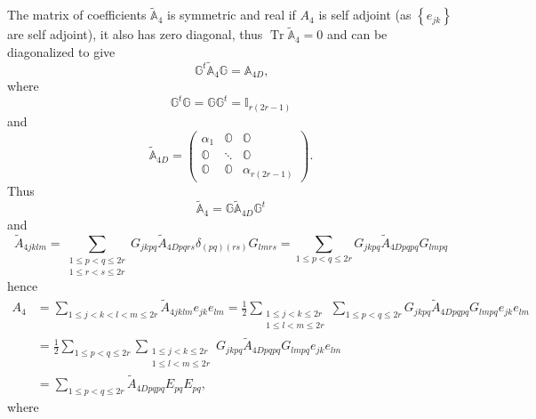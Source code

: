\documentclass[aps, preprint]{revtex4}
\begin{document}
The matrix of coefficients $\widetilde{\mathbb{A}}_{4}$ is symmetric and real if $A_{4}$ is self adjoint (as $\left \{e_{j k}\right \}$ are self adjoint), it also has zero diagonal, thus $\ensuremath{\operatorname*{Tr}}\widetilde{\mathbb{A}}_{4} =0$ and can be diagonalized to give
\begin{equation}\mathbb{G}^{t} \widetilde{\mathbb{A}}_{4} \mathbb{G} =\mathbb{A}_{4 D}\text{,}
\end{equation}where
\begin{equation}\mathbb{G}^{t} \mathbb{G} =\mathbb{G} \mathbb{G}^{t} =\mathbb{I}_{r \left (2 r -1\right )}
\end{equation}and
\begin{equation}\widetilde{\mathbb{A}}_{4 D} =\left (\begin{array}{ccc}\alpha _{1} & \mathbb{O} & \mathbb{O} \\
\mathbb{O} & \ddots  & \mathbb{O} \\
\mathbb{O} & \mathbb{O} & \alpha _{r \left (2 r -1\right )}\end{array}\right )\text{.}
\end{equation}Thus
\begin{equation}\widetilde{\mathbb{A}}_{4} =\mathbb{G} \widetilde{\mathbb{A}}_{4 D} \mathbb{G}^{t}
\end{equation}and
\begin{equation}\widetilde{A}_{4 j k l m} ={\displaystyle\sum _{\begin{array}{c}1 \leq p <q \leq 2 r \\
1 \leq r <s \leq 2 r\end{array}}}G_{j k p q} \widetilde{A}_{4 D p q r s} \delta _{\left (p q\right ) \left (r s\right )} G_{l m r s} ={\displaystyle\sum _{1 \leq p <q \leq 2 r}}G_{j k p q} \widetilde{A}_{4 D p q p q} G_{l m p q}
\end{equation}hence
\begin{align}A_{4} &  ={\displaystyle\sum _{1 \leq j <k <l <m \leq 2 r}}\widetilde{A}_{4 j k l m} e_{j k} e_{l m} =\frac{1}{2} {\displaystyle\sum _{\begin{array}{c}1 \leq j <k \leq 2 r \\
1 \leq l <m \leq 2 r\end{array}}}{\displaystyle\sum _{1 \leq p <q \leq 2 r}}G_{j k p q} \widetilde{A}_{4 D p q p q} G_{l m p q} e_{j k} e_{l m} \\
 &  =\frac{1}{2} {\displaystyle\sum _{1 \leq p <q \leq 2 r}}{\displaystyle\sum _{\begin{array}{c}1 \leq j <k \leq 2 r \\
1 \leq l <m \leq 2 r\end{array}}}G_{j k p q} \widetilde{A}_{4 D p q p q} G_{l m p q} e_{j k} e_{l m} \\
 &  ={\displaystyle\sum _{1 \leq p <q \leq 2 r}}\widetilde{A}_{4 D p q p q} E_{p q} E_{p q}\text{,}\end{align}where
\end{document}
